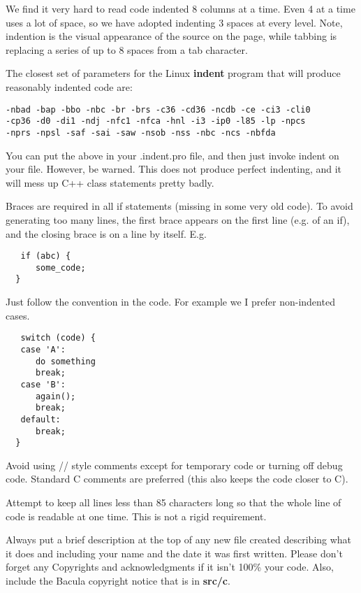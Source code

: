 We find it very hard to read code indented 8 columns at a time. 
Even 4 at a time uses a lot of space, so we have adopted indenting
3 spaces at every level. Note, indention is the visual appearance of the
source on the page, while tabbing is replacing a series of up to 8 spaces from
a tab character. 

The closest set of parameters for the Linux {\bf indent} program that will
produce reasonably indented code are: 

\footnotesize
\begin{verbatim}
-nbad -bap -bbo -nbc -br -brs -c36 -cd36 -ncdb -ce -ci3 -cli0
-cp36 -d0 -di1 -ndj -nfc1 -nfca -hnl -i3 -ip0 -l85 -lp -npcs
-nprs -npsl -saf -sai -saw -nsob -nss -nbc -ncs -nbfda
\end{verbatim}
\normalsize

You can put the above in your .indent.pro file, and then just invoke indent on
your file. However, be warned. This does not produce perfect indenting, and it
will mess up C++ class statements pretty badly. 

Braces are required in all if statements (missing in some very old code). To
avoid generating too many lines, the first brace appears on the first line
(e.g. of an if), and the closing brace is on a line by itself. E.g. 

\footnotesize
\begin{verbatim}
   if (abc) {
      some_code;
  }
\end{verbatim}
\normalsize

Just follow the convention in the code. For example we I prefer non-indented cases. 

\footnotesize
\begin{verbatim}
   switch (code) {
   case 'A':
      do something
      break;
   case 'B':
      again();
      break;
   default:
      break;
  }
\end{verbatim}
\normalsize

Avoid using // style comments except for temporary code or turning off debug
code. Standard C comments are preferred (this also keeps the code closer to
C). 

Attempt to keep all lines less than 85 characters long so that the whole line
of code is readable at one time. This is not a rigid requirement. 

Always put a brief description at the top of any new file created describing
what it does and including your name and the date it was first written. Please
don't forget any Copyrights and acknowledgments if it isn't 100\% your code.
Also, include the Bacula copyright notice that is in {\bf src/c}. 

